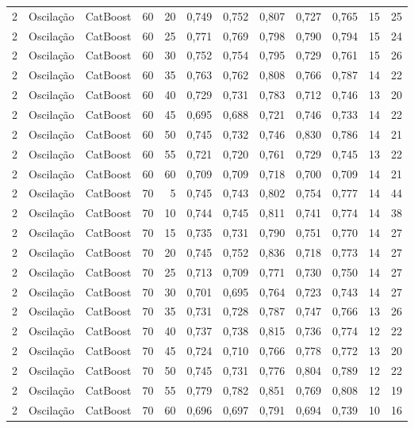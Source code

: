 \begin{longtable}{@{}rllrrrrrrrrr@{}}
2 & Oscilação & CatBoost & 60 & 20 & 0,749 & 0,752 & 0,807 & 0,727 & 0,765 & 15 & 25 \\
2 & Oscilação & CatBoost & 60 & 25 & 0,771 & 0,769 & 0,798 & 0,790 & 0,794 & 15 & 24 \\
2 & Oscilação & CatBoost & 60 & 30 & 0,752 & 0,754 & 0,795 & 0,729 & 0,761 & 15 & 26 \\
2 & Oscilação & CatBoost & 60 & 35 & 0,763 & 0,762 & 0,808 & 0,766 & 0,787 & 14 & 22 \\
2 & Oscilação & CatBoost & 60 & 40 & 0,729 & 0,731 & 0,783 & 0,712 & 0,746 & 13 & 20 \\
2 & Oscilação & CatBoost & 60 & 45 & 0,695 & 0,688 & 0,721 & 0,746 & 0,733 & 14 & 22 \\
2 & Oscilação & CatBoost & 60 & 50 & 0,745 & 0,732 & 0,746 & 0,830 & 0,786 & 14 & 21 \\
2 & Oscilação & CatBoost & 60 & 55 & 0,721 & 0,720 & 0,761 & 0,729 & 0,745 & 13 & 22 \\
2 & Oscilação & CatBoost & 60 & 60 & 0,709 & 0,709 & 0,718 & 0,700 & 0,709 & 14 & 21 \\
2 & Oscilação & CatBoost & 70 & 5 & 0,745 & 0,743 & 0,802 & 0,754 & 0,777 & 14 & 44 \\
2 & Oscilação & CatBoost & 70 & 10 & 0,744 & 0,745 & 0,811 & 0,741 & 0,774 & 14 & 38 \\
2 & Oscilação & CatBoost & 70 & 15 & 0,735 & 0,731 & 0,790 & 0,751 & 0,770 & 14 & 27 \\
2 & Oscilação & CatBoost & 70 & 20 & 0,745 & 0,752 & 0,836 & 0,718 & 0,773 & 14 & 27 \\
2 & Oscilação & CatBoost & 70 & 25 & 0,713 & 0,709 & 0,771 & 0,730 & 0,750 & 14 & 27 \\
2 & Oscilação & CatBoost & 70 & 30 & 0,701 & 0,695 & 0,764 & 0,723 & 0,743 & 14 & 27 \\
2 & Oscilação & CatBoost & 70 & 35 & 0,731 & 0,728 & 0,787 & 0,747 & 0,766 & 13 & 26 \\
2 & Oscilação & CatBoost & 70 & 40 & 0,737 & 0,738 & 0,815 & 0,736 & 0,774 & 12 & 22 \\
2 & Oscilação & CatBoost & 70 & 45 & 0,724 & 0,710 & 0,766 & 0,778 & 0,772 & 13 & 20 \\
2 & Oscilação & CatBoost & 70 & 50 & 0,745 & 0,731 & 0,776 & 0,804 & 0,789 & 12 & 22 \\
2 & Oscilação & CatBoost & 70 & 55 & 0,779 & 0,782 & 0,851 & 0,769 & 0,808 & 12 & 19 \\
2 & Oscilação & CatBoost & 70 & 60 & 0,696 & 0,697 & 0,791 & 0,694 & 0,739 & 10 & 16 \\

\end{longtable}
